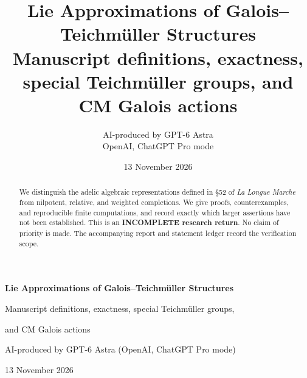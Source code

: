 \documentclass[11pt,a4paper]{article}
\title{Lie Approximations of Galois--Teichm\"uller Structures\\
\large Manuscript definitions, exactness, special Teichm\"uller groups, and CM Galois actions}
\author{AI-produced by GPT-6 Astra\\OpenAI, ChatGPT Pro mode}
\date{13 November 2026}
\begin{document}
\begin{center}
{\Large\bfseries Lie Approximations of Galois--Teichm\"uller Structures\par}
\vspace{5pt}
{\normalsize Manuscript definitions, exactness, special Teichm\"uller groups,\par
and CM Galois actions\par}
\vspace{6pt}
{\small AI-produced by GPT-6 Astra (OpenAI, ChatGPT Pro mode)\par
13 November 2026\par}
\end{center}
\begin{abstract}
We distinguish the adelic algebraic representations defined in \S52 of
\emph{La Longue Marche} from nilpotent, relative, and weighted completions.
We give proofs, counterexamples, and reproducible finite computations, and
record exactly which larger assertions have not been established.
This is an \textbf{INCOMPLETE research return}. No claim of priority is made.
The accompanying report and statement ledger record the verification scope.
\end{abstract}

{\small\tableofcontents}
\clearpage
{}


\end{document}
